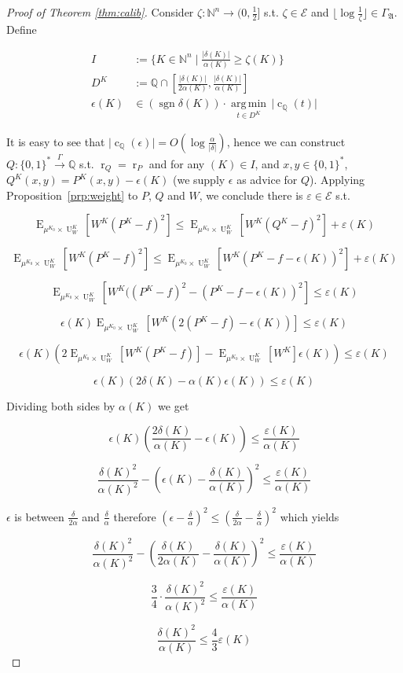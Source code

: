 \documentclass{article}
\numberwithin{equation}{section}
\theoremstyle{definition}
\theoremstyle{plain}
\newcommand{\Bool}{\{0,1\}}
\newcommand{\Words}{{\Bool^*}}
\DeclareMathOperator{\Sgn}{sgn}
\DeclareMathOperator{\E}{E}
\DeclareMathOperator{\R}{r}
\DeclareMathOperator{\Un}{U}
\DeclareMathOperator{\En}{c}
\newcommand{\Argmin}[1]{\underset{#1}{\operatorname{arg\,min}}\,}
\newcommand{\Nats}{\mathbb{N}}
\newcommand{\Rats}{\mathbb{Q}}
\newcommand{\Abs}[1]{\lvert #1 \rvert}
\newcommand{\Floor}[1]{\lfloor #1 \rfloor}
\newcommand{\GrowA}{\Gamma_{\mathfrak{A}}}
\newcommand{\Fall}{\mathcal{E}}
\newcommand{\Scheme}{\xrightarrow{\Gamma}}
\begin{document}
\begin{proof}[Proof of Theorem \ref{thm:calib}]

Consider $\zeta: \Nats^n \rightarrow (0,\frac{1}{2}]$ s.t.  $\zeta \in \Fall$ and $\Floor{\log \frac{1}{\zeta}} \in \GrowA$. Define 

\begin{align*}
I&:=\{K \in \Nats^n \mid \frac{\Abs{\delta(K)}}{\alpha(K)} \geq \zeta(K)\} \\
D^{K}&:=\Rats \cap [\frac{\Abs{\delta(K)}}{2\alpha(K)},\frac{\Abs{\delta(K)}}{\alpha(K)}] \\
\epsilon(K) &\in (\Sgn \delta(K)) \cdot \Argmin{t \in D^{K}} \Abs{\En_\Rats(t)}
\end{align*}

It is easy to see that ${\Abs{\En_\Rats(\epsilon)} = O(\log \frac{\alpha}{\Abs{\delta}})}$, hence we can construct $Q: \Words \Scheme \Rats$ s.t. $\R_Q=\R_P$ and for any $(K) \in I$, and $x,y \in \Words$, $Q^{K}(x,y)=P^{K}(x,y)-\epsilon(K)$ (we supply $\epsilon$ as advice for $Q$). Applying Proposition~\ref{prp:weight} to $P$, $Q$ and $W$, we conclude there is $\varepsilon \in \Fall$ s.t.

$$\E_{\mu^{K_0} \times \Un_W^{K}}[W^{K}(P^{K} - f)^2] \leq \E_{\mu^{K_0} \times \Un_W^{K}}[W^{K}(Q^{K}-f)^2] + \varepsilon(K)$$

$$\E_{\mu^{K_0} \times \Un_W^{K}}[W^{K}(P^{K} - f)^2] \leq \E_{\mu^{K_0} \times \Un_W^{K}}[W^{K}(P^{K}-f-\epsilon(K))^2] + \varepsilon(K)$$

$$\E_{\mu^{K_0} \times \Un_W^{K}}[W^{K}((P^{K} - f)^2 - (P^{K}-f-\epsilon(K))^2] \leq \varepsilon(K)$$

$$ \epsilon(K) \E_{\mu^{K_0} \times \Un_W^{K}}[W^{K}(2(P^{K} - f) - \epsilon(K))] \leq \varepsilon(K)$$

$$ \epsilon(K) (2 \E_{\mu^{K_0} \times \Un_W^{K}}[W^{K}(P^{K} - f)]-\E_{\mu^{K_0} \times \Un_W^{K}}[W^{K}]\epsilon(K)) \leq \varepsilon(K)$$

$$ \epsilon(K) (2 \delta(K) - \alpha(K)\epsilon(K)) \leq \varepsilon(K)$$

Dividing both sides by $ \alpha(K)$ we get

$$\epsilon(K) (\frac{2\delta(K)}{\alpha(K)} - \epsilon(K)) \leq \frac{\varepsilon(K)}{\alpha(K)}$$

$$\frac{\delta(K)^2}{\alpha(K)^2}-(\epsilon(K) - \frac{\delta(K)}{\alpha(K)})^2 \leq \frac{\varepsilon(K)}{\alpha(K)}$$

$\epsilon$ is between $\frac{\delta}{2\alpha}$ and $\frac{\delta}{\alpha}$ therefore $(\epsilon-\frac{\delta}{\alpha})^2 \leq (\frac{\delta}{2\alpha} - \frac{\delta}{\alpha})^2$  which yields

$$\frac{\delta(K)^2}{\alpha(K)^2}-(\frac{\delta(K)}{2\alpha(K)} - \frac{\delta(K)}{\alpha(K)})^2 \leq \frac{\varepsilon(K)}{\alpha(K)}$$

$$\frac{3}{4} \cdot \frac{\delta(K)^2}{\alpha(K)^2} \leq \frac{\varepsilon(K)}{\alpha(K)}$$

$$\frac{\delta(K)^2}{\alpha(K)} \leq \frac{4}{3}\varepsilon(K)$$
\end{proof}
\end{document}
